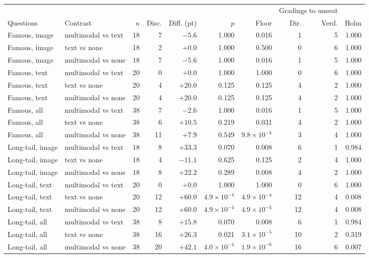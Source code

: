 \begin{tabular}{llrrrrrrrr}
\toprule
& & & & & & & \multicolumn{2}{c}{Gradings to unseat} & \\
\cmidrule(lr){8-9}
Questions & Contrast & $n$ & Disc. & Diff. (pt) & $p$ & Floor & Dir. & Verd. & Holm \\
\midrule
Famous, image & multimodal vs text & 18 & 7 & $-5.6$ & 1.000 & 0.016 & 1 & 5 & 1.000 \\
Famous, image & text vs none & 18 & 2 & $+0.0$ & 1.000 & 0.500 & 0 & 6 & 1.000 \\
Famous, image & multimodal vs none & 18 & 7 & $-5.6$ & 1.000 & 0.016 & 1 & 5 & 1.000 \\
Famous, text & multimodal vs text & 20 & 0 & $+0.0$ & 1.000 & 1.000 & 0 & 6 & 1.000 \\
Famous, text & text vs none & 20 & 4 & $+20.0$ & 0.125 & 0.125 & 4 & 2 & 1.000 \\
Famous, text & multimodal vs none & 20 & 4 & $+20.0$ & 0.125 & 0.125 & 4 & 2 & 1.000 \\
Famous, all & multimodal vs text & 38 & 7 & $-2.6$ & 1.000 & 0.016 & 1 & 5 & 1.000 \\
Famous, all & text vs none & 38 & 6 & $+10.5$ & 0.219 & 0.031 & 4 & 2 & 1.000 \\
Famous, all & multimodal vs none & 38 & 11 & $+7.9$ & 0.549 & $9.8 \times 10^{-4}$ & 3 & 4 & 1.000 \\
Long-tail, image & multimodal vs text & 18 & 8 & $+33.3$ & 0.070 & 0.008 & 6 & 1 & 0.984 \\
Long-tail, image & text vs none & 18 & 4 & $-11.1$ & 0.625 & 0.125 & 2 & 4 & 1.000 \\
Long-tail, image & multimodal vs none & 18 & 8 & $+22.2$ & 0.289 & 0.008 & 4 & 2 & 1.000 \\
Long-tail, text & multimodal vs text & 20 & 0 & $+0.0$ & 1.000 & 1.000 & 0 & 6 & 1.000 \\
Long-tail, text & text vs none & 20 & 12 & $+60.0$ & $4.9 \times 10^{-4}$ & $4.9 \times 10^{-4}$ & 12 & 4 & 0.008 \\
Long-tail, text & multimodal vs none & 20 & 12 & $+60.0$ & $4.9 \times 10^{-4}$ & $4.9 \times 10^{-4}$ & 12 & 4 & 0.008 \\
Long-tail, all & multimodal vs text & 38 & 8 & $+15.8$ & 0.070 & 0.008 & 6 & 1 & 0.984 \\
Long-tail, all & text vs none & 38 & 16 & $+26.3$ & 0.021 & $3.1 \times 10^{-5}$ & 10 & 2 & 0.319 \\
Long-tail, all & multimodal vs none & 38 & 20 & $+42.1$ & $4.0 \times 10^{-4}$ & $1.9 \times 10^{-6}$ & 16 & 6 & 0.007 \\
\bottomrule
\end{tabular}
